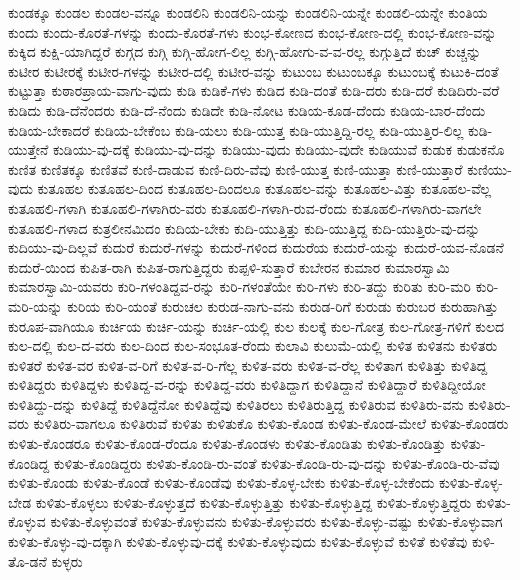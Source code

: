 {ಕುಂಡಕ್ಕೂ
ಕುಂಡಲ
ಕುಂಡಲ-ವನ್ನೂ
ಕುಂಡಲಿನಿ
ಕುಂಡಲಿನಿ-ಯನ್ನು
ಕುಂಡಲಿನಿ-ಯನ್ನೇ
ಕುಂಡಲಿ-ಯನ್ನೇ
ಕುಂತಿಯ
ಕುಂದು
ಕುಂದು-ಕೊರತೆ-ಗಳನ್ನು
ಕುಂದು-ಕೊರತೆ-ಗಳು
ಕುಂಭ-ಕೋಣದ
ಕುಂಭ-ಕೋಣ-ದಲ್ಲಿ
ಕುಂಭ-ಕೋಣ-ವನ್ನು
ಕುಕ್ಕಿದ
ಕುಕ್ಷಿ-ಯಾಗಿದ್ದರೆ
ಕುಗ್ಗದ
ಕುಗ್ಗಿ
ಕುಗ್ಗಿ-ಹೋಗ-ಲಿಲ್ಲ
ಕುಗ್ಗಿ-ಹೋಗು-ವ-ವ-ರಲ್ಲ
ಕುಗ್ಗುತ್ತಿದೆ
ಕುಚ್
ಕುಚ್ಚನ್ನು
ಕುಟೀರ
ಕುಟೀರಕ್ಕೆ
ಕುಟೀರ-ಗಳನ್ನು
ಕುಟೀರ-ದಲ್ಲಿ
ಕುಟೀರ-ವನ್ನು
ಕುಟುಂಬ
ಕುಟುಂಬಕ್ಕೂ
ಕುಟುಂಬಕ್ಕೆ
ಕುಟುಕಿ-ದಂತೆ
ಕುಟ್ಟುತ್ತಾ
ಕುಠಾರಪ್ರಾಯ-ವಾಗು-ವುದು
ಕುಡಿ
ಕುಡಿಕೆ-ಗಳು
ಕುಡಿದ
ಕುಡಿ-ದಂತೆ
ಕುಡಿ-ದರು
ಕುಡಿ-ದರೆ
ಕುಡಿದಿರು-ವರೆ
ಕುಡಿದು
ಕುಡಿ-ದೆನೆಂದರು
ಕುಡಿ-ದೆ-ನೆಂದು
ಕುಡಿದೇ
ಕುಡಿ-ನೋಟ
ಕುಡಿಯ-ಕೂಡ-ದೆಂದು
ಕುಡಿಯ-ಬಾರ-ದೆಂದು
ಕುಡಿಯ-ಬೇಕಾದರೆ
ಕುಡಿಯ-ಬೇಕೆಂಬ
ಕುಡಿ-ಯಲು
ಕುಡಿ-ಯುತ್ತ
ಕುಡಿ-ಯುತ್ತಿದ್ದಿ-ರಲ್ಲ
ಕುಡಿ-ಯುತ್ತಿರ-ಲಿಲ್ಲ
ಕುಡಿ-ಯುತ್ತೇನೆ
ಕುಡಿಯು-ವು-ದಕ್ಕೆ
ಕುಡಿಯು-ವು-ದನ್ನು
ಕುಡಿಯು-ವುದು
ಕುಡಿಯು-ವುದೇ
ಕುಡಿಯುವೆ
ಕುಡುಕ
ಕುಡುಕನೊ
ಕುಣಿತ
ಕುಣಿತಕ್ಕೂ
ಕುಣಿತವೆ
ಕುಣಿ-ದಾಡುವ
ಕುಣಿ-ದಿರು-ವೆವು
ಕುಣಿ-ಯುತ್ತ
ಕುಣಿ-ಯುತ್ತಾ
ಕುಣಿ-ಯುತ್ತಾರೆ
ಕುಣಿಯು-ವುದು
ಕುತೂಹಲ
ಕುತೂಹಲ-ದಿಂದ
ಕುತೂಹಲ-ದಿಂದಲೂ
ಕುತೂಹಲ-ವನ್ನು
ಕುತೂಹಲ-ವಿತ್ತು
ಕುತೂಹಲ-ವೆಲ್ಲ
ಕುತೂಹಲಿ-ಗಳಾಗಿ
ಕುತೂಹಲಿ-ಗಳಾಗಿರು-ವರು
ಕುತೂಹಲಿ-ಗಳಾಗಿ-ರುವ-ರೆಂದು
ಕುತೂಹಲಿ-ಗಳಾಗಿರು-ವಾಗಲೇ
ಕುತೂಹಲಿ-ಗಳಾದ
ಕುತ್ರಲೀನಮಿದಂ
ಕುದಿಯ-ಬೇಕು
ಕುದಿ-ಯುತ್ತಿತ್ತು
ಕುದಿ-ಯುತ್ತಿದ್ದ
ಕುದಿ-ಯುತ್ತಿರು-ವು-ದನ್ನು
ಕುದಿಯು-ವು-ದಿಲ್ಲವೆ
ಕುದುರೆ
ಕುದುರೆ-ಗಳನ್ನು
ಕುದುರೆ-ಗಳಿಂದ
ಕುದುರೆಯ
ಕುದುರೆ-ಯನ್ನು
ಕುದುರೆ-ಯವ-ನೊಡನೆ
ಕುದುರೆ-ಯಿಂದ
ಕುಪಿತ-ರಾಗಿ
ಕುಪಿತ-ರಾಗುತ್ತಿದ್ದರು
ಕುಪ್ಪಳಿ-ಸುತ್ತಾರೆ
ಕುಬೇರನ
ಕುಮಾರ
ಕುಮಾರಸ್ವಾಮಿ
ಕುಮಾರಸ್ವಾಮಿ-ಯವರು
ಕುರಿ-ಗಳಂತಿದ್ದವ-ರನ್ನು
ಕುರಿ-ಗಳಂತೆಯೇ
ಕುರಿ-ಗಳು
ಕುರಿ-ತದ್ದು
ಕುರಿತು
ಕುರಿ-ಮರಿ
ಕುರಿ-ಮರಿ-ಯನ್ನು
ಕುರಿಯ
ಕುರಿ-ಯಂತೆ
ಕುರುಚಲ
ಕುರುಡ-ನಾಗು-ವನು
ಕುರುಡ-ರಿಗೆ
ಕುರುಡು
ಕುರುಬರ
ಕುರುಹಾಗಿತ್ತು
ಕುರೂಪ-ವಾಗಿಯೂ
ಕುರ್ಚಿಯ
ಕುರ್ಚಿ-ಯನ್ನು
ಕುರ್ಚಿ-ಯಲ್ಲಿ
ಕುಲ
ಕುಲಕ್ಕೆ
ಕುಲ-ಗೋತ್ರ
ಕುಲ-ಗೋತ್ರ-ಗಳಿಗೆ
ಕುಲದ
ಕುಲ-ದಲ್ಲಿ
ಕುಲ-ದ-ವರು
ಕುಲ-ದಿಂದ
ಕುಲ-ಸಂಭೂತ-ರೆಂದು
ಕುಲಾವಿ
ಕುಲುಮೆ-ಯಲ್ಲಿ
ಕುಳಿತ
ಕುಳಿತನು
ಕುಳಿತರು
ಕುಳಿತರೆ
ಕುಳಿತ-ವರ
ಕುಳಿತ-ವ-ರಿಗೆ
ಕುಳಿತ-ವ-ರಿ-ಗೆಲ್ಲ
ಕುಳಿತ-ವರು
ಕುಳಿತ-ವ-ರೆಲ್ಲ
ಕುಳಿತಾಗ
ಕುಳಿತಿತ್ತು
ಕುಳಿತಿದ್ದ
ಕುಳಿತಿದ್ದರು
ಕುಳಿತಿದ್ದಳು
ಕುಳಿತಿದ್ದ-ವ-ರನ್ನು
ಕುಳಿತಿದ್ದ-ವರು
ಕುಳಿತಿದ್ದಾಗ
ಕುಳಿತಿದ್ದಾನೆ
ಕುಳಿತಿದ್ದಾರೆ
ಕುಳಿತಿದ್ದೀಯೋ
ಕುಳಿತಿದ್ದು-ದನ್ನು
ಕುಳಿತಿದ್ದೆ
ಕುಳಿತಿದ್ದೆನೋ
ಕುಳಿತಿದ್ದೆವು
ಕುಳಿತಿರಲು
ಕುಳಿತಿರುತ್ತಿದ್ದ
ಕುಳಿತಿರುವ
ಕುಳಿತಿರು-ವನು
ಕುಳಿತಿರು-ವರು
ಕುಳಿತಿರು-ವಾಗಲೂ
ಕುಳಿತಿರುವೆ
ಕುಳಿತು
ಕುಳಿತುಕೊ
ಕುಳಿತು-ಕೊಂಡ
ಕುಳಿತು-ಕೊಂಡ-ಮೇಲೆ
ಕುಳಿತು-ಕೊಂಡರು
ಕುಳಿತು-ಕೊಂಡರೂ
ಕುಳಿತು-ಕೊಂಡ-ರೆಂದೂ
ಕುಳಿತು-ಕೊಂಡಳು
ಕುಳಿತು-ಕೊಂಡಿತು
ಕುಳಿತು-ಕೊಂಡಿತ್ತು
ಕುಳಿತು-ಕೊಂಡಿದ್ದ
ಕುಳಿತು-ಕೊಂಡಿದ್ದರು
ಕುಳಿತು-ಕೊಂಡಿ-ರು-ವಂತೆ
ಕುಳಿತು-ಕೊಂಡಿ-ರು-ವು-ದನ್ನು
ಕುಳಿತು-ಕೊಂಡಿ-ರು-ವೆವು
ಕುಳಿತು-ಕೊಂಡು
ಕುಳಿತು-ಕೊಂಡೆ
ಕುಳಿತು-ಕೊಂಡೆವು
ಕುಳಿತು-ಕೊಳ್ಳ-ಬೇಕು
ಕುಳಿತು-ಕೊಳ್ಳ-ಬೇಕೆಂದು
ಕುಳಿತು-ಕೊಳ್ಳ-ಬೇಡ
ಕುಳಿತು-ಕೊಳ್ಳಲು
ಕುಳಿತು-ಕೊಳ್ಳುತ್ತದೆ
ಕುಳಿತು-ಕೊಳ್ಳುತ್ತಿತ್ತು
ಕುಳಿತು-ಕೊಳ್ಳುತ್ತಿದ್ದ
ಕುಳಿತು-ಕೊಳ್ಳುತ್ತಿದ್ದರು
ಕುಳಿತು-ಕೊಳ್ಳುವ
ಕುಳಿತು-ಕೊಳ್ಳುವಂತೆ
ಕುಳಿತು-ಕೊಳ್ಳುವನು
ಕುಳಿತು-ಕೊಳ್ಳುವರು
ಕುಳಿತು-ಕೊಳ್ಳು-ವಷ್ಟು
ಕುಳಿತು-ಕೊಳ್ಳುವಾಗ
ಕುಳಿತು-ಕೊಳ್ಳು-ವು-ದಕ್ಕಾಗಿ
ಕುಳಿತು-ಕೊಳ್ಳುವು-ದಕ್ಕೆ
ಕುಳಿತು-ಕೊಳ್ಳುವುದು
ಕುಳಿತು-ಕೊಳ್ಳುವೆ
ಕುಳಿತೆ
ಕುಳಿತೆವು
ಕುಳಿ-ತೊ-ಡನೆ
ಕುಳ್ಳರು
}
